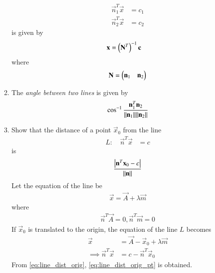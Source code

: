 \begin{enumerate}[label=\arabic*.,ref=\thesubsection.\theenumi]
\begin{align}
\vec{n}_1^T\vec{x} &=c_1
\\
\vec{n}_2^T\vec{x} &=c_2
\end{align}
is given by 
\begin{align}
\mathbf{x} &=\left(\mathbf{N}^T\right)^{-1}\mathbf{c}
\end{align}
where 
\begin{align}
\mathbf{N} = \begin{pmatrix}\mathbf{n}_1 & \mathbf{n}_2\end{pmatrix}
\end{align}
\item The {\em angle between two lines} is given by 
\begin{align}
\cos ^{-1} \frac{\mathbf{n}_1 ^T \mathbf{n}_2}{\lVert\mathbf{n}_1\rVert  \lVert\mathbf{n}_2\rVert}
\end{align}
\item Show that the distance of a point $\vec{x}_0$ from the line 
\begin{align}
L: \quad \vec{n}^T\vec{x} &=c
\end{align}
is 
\begin{align}
\frac{\left\vert\mathbf{n}^T\mathbf{x}_0-c\right\vert}{\lVert\mathbf{n}\rVert} 
\end{align}
\solution Let the equation of the line be 
\begin{align}
\vec{x} = \vec{A} + \lambda \vec{m}
\end{align}
%
where 
\begin{align}
\label{eq:line_dist_orig_pt}
\vec{n}^T\vec{A} = 0, \vec{n}^T\vec{m} = 0
\end{align}
If $\vec{x}_0$ is translated to the origin, the equation of the line $L$ becomes 
\begin{align}
\vec{x} &= \vec{A}- \vec{x}_0+ \lambda \vec{m}
\\
\implies 
\vec{n}^T\vec{x} &=c-\vec{n}^T\vec{x}_0
\end{align}
From \eqref{eq:line_dist_orig}, \eqref{eq:line_dist_orig_pt} is obtained.

\end{enumerate}
%
